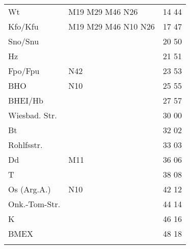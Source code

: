 \begin{tabular}{!{\color{schiefergrau}\vrule width 3pt}*{3}{l!{\color{schiefergrau}\vrule width 3pt}}}
\hline
{}
 \\
\hline
Wt           & \nueins{} \nuzwei{} \mbus{} M19 M29 M46 \nbus{} N26               & 14 44 \\
Kfo/Kfu      & \nueins{} \nuzwei{} \nuneun{} \mbus{} M19 M29 M46 \nbus{} N10 N26 & 17 47 \\
Sno/Snu      & \nuneun{}                                                         & 20 50 \\
Hz           &                                                                   & 21 51 \\
Fpo/Fpu      & \nusieben{} \nbus{} N42                                           & 23 53 \\
BHO          & \nbus{} N10                                                       & 25 55 \\
BHEI/Hb      &                                                                   & 27 57 \\
Wiesbad. Str.&                                                                   & 30 00 \\
Bt           &                                                                   & 32 02 \\
Rohlfsstr.   &                                                                   & 33 03 \\
Dd           & \mbus{} M11                                                       & 36 06 \\
T            &                                                                   & 38 08 \\
Os (Arg.A.)  & \nbus{} N10                                                       & 42 12 \\
Onk.-Tom-Str.&                                                                   & 44 14 \\
K            &                                                                   & 46 16 \\
BMEX         &                                                                   & 48 18 \\
\myhline
\end{tabular}
%
